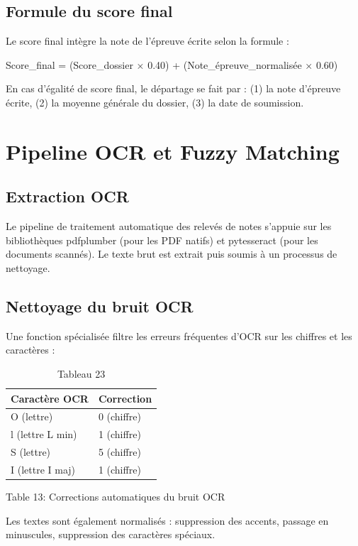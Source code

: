 \subsection{Formule du score final}

Le score final intègre la note de l'épreuve écrite selon la formule :

Score\_final = (Score\_dossier × 0.40) + (Note\_épreuve\_normalisée × 0.60)

En cas d'égalité de score final, le départage se fait par : (1) la note d'épreuve écrite, (2) la moyenne générale du dossier, (3) la date de soumission.

\section{Pipeline OCR et Fuzzy Matching}

\subsection{Extraction OCR}

Le pipeline de traitement automatique des relevés de notes s'appuie sur les bibliothèques pdfplumber (pour les PDF natifs) et pytesseract (pour les documents scannés). Le texte brut est extrait puis soumis à un processus de nettoyage.

\subsection{Nettoyage du bruit OCR}

Une fonction spécialisée filtre les erreurs fréquentes d'OCR sur les chiffres et les caractères :

\begin{table}[htbp]
\centering
\begin{tabular}{|l|l|}
\hline
Caractère OCR & Correction \\
\hline
O (lettre) & 0 (chiffre) \\
\hline
l (lettre L min) & 1 (chiffre) \\
\hline
S (lettre) & 5 (chiffre) \\
\hline
I (lettre I maj) & 1 (chiffre) \\
\hline
\end{tabular}
\caption{Tableau 23}
\label{tab:table_23}
\end{table}

Table 13: Corrections automatiques du bruit OCR

Les textes sont également normalisés : suppression des accents, passage en minuscules, suppression des caractères spéciaux.

